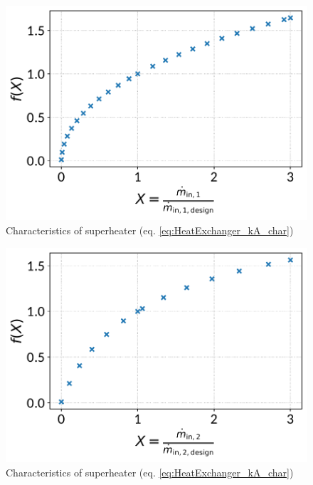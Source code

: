 \documentclass[]{article}
\begin{document}
\begin{minipage}{0.5\textwidth}
\begin{figure}[H]\begin{center}
\includegraphics[width=\textwidth]{figures/HeatExchanger_CharLine_kA_char1_superheater.pdf}
\caption{Characteristics of superheater (eq. \ref{eq:HeatExchanger_kA_char})}
\label{fig:CharLine_kA_char1_superheater}
\end{center}\end{figure}

\end{minipage}
\begin{minipage}{0.5\textwidth}
\begin{figure}[H]\begin{center}
\includegraphics[width=\textwidth]{figures/HeatExchanger_CharLine_kA_char2_superheater.pdf}
\caption{Characteristics of superheater (eq. \ref{eq:HeatExchanger_kA_char})}
\label{fig:CharLine_kA_char2_superheater}
\end{center}\end{figure}

\end{minipage}
\end{document}
